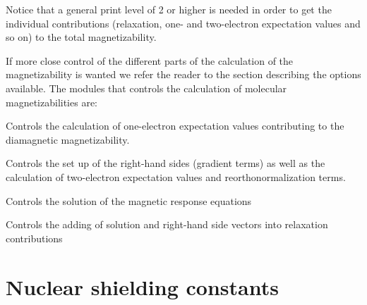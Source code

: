 Notice that a general print level of 2 or higher is needed in order to
get the individual contributions (relaxation, one- and
two-electron expectation values and so on) to the total magnetizability.

If more close control of the different parts of the calculation of the
magnetizability is wanted we refer the reader to the section
describing the options available. The modules that controls the
calculation of molecular magnetizabilities are:

\begin{list}{}{\itemsep 0.10cm \parsep 0.0cm}
\item[\Sec{EXPECT}] Controls the calculation of one-electron
expectation values contributing to the diamagnetic magnetizability.
\item[\Sec{GETSGY}] Controls the set up of the right-hand sides
(gradient terms) as well as the calculation of two-electron
expectation values and reorthonormalization terms.
\item[\Sec{LINRES}] Controls the solution of the magnetic response
equations
\item[\Sec{RELAX}] Controls the adding of solution and right-hand
side vectors into relaxation contributions
\end{list}

\section{Nuclear shielding constants}\label{sec:shieldings}

\begin{center}
\end{center}



